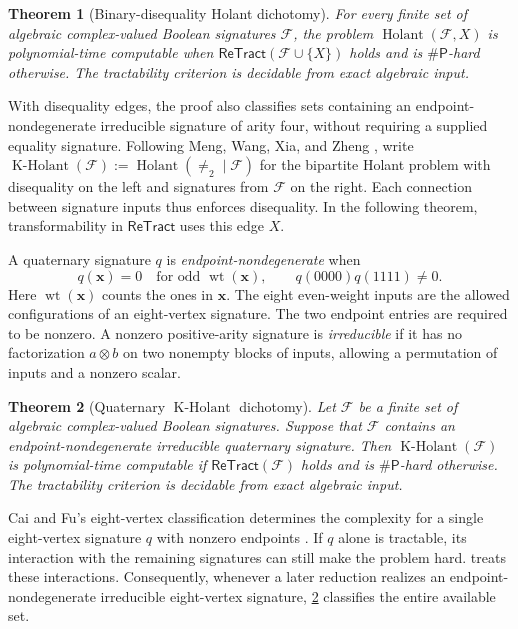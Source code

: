 \documentclass[11pt,letterpaper,onecolumn]{article}
\theoremstyle{plain}
\newtheorem{theorem}{Theorem}[section]
\theoremstyle{definition}
\theoremstyle{remark}
\newcommand{\cF}{\mathcal F}
\newcommand{\Holant}{\operatorname{Holant}}
\newcommand{\KHolant}{\operatorname{K\text{-}Holant}}
\newcommand{\ReTract}{\mathsf{ReTract}}
\newcommand{\SharpP}{\#\mathsf P}
\newcommand{\wt}{\operatorname{wt}}
\newcommand{\Neq}{\neq}
\begin{document}
\begin{theorem}[Binary-disequality Holant dichotomy]
\label{thm:p1-deq2-dichotomy}
For every finite set of algebraic complex-valued Boolean signatures \(\cF\),
the problem \(\Holant(\cF,X)\) is polynomial-time computable when
\(\ReTract(\cF\cup\{X\})\) holds and is \(\SharpP\)-hard otherwise.
The tractability criterion is decidable from exact algebraic input.
\end{theorem}

With disequality edges, the proof also classifies sets containing an
endpoint-nondegenerate irreducible signature of arity four, without
requiring a supplied equality signature. Following Meng, Wang, Xia, and Zheng
\cite{MengWangXiaZheng2025}, write
\(\KHolant(\cF):=\Holant(\Neq_2\mid\cF)\) for the bipartite Holant
problem with disequality on the left and signatures from \(\cF\) on the
right. Each connection between signature inputs thus enforces disequality.
In the following theorem, transformability in \(\ReTract\) uses this edge \(X\).

A quaternary signature \(q\) is
\emph{endpoint-nondegenerate} when
\[
 q({\mathbf{x}})=0\quad\text{for odd }\wt({\mathbf{x}}),\qquad q(0000)q(1111)\ne0.
\]
Here \(\wt({\mathbf{x}})\) counts the ones in \({\mathbf{x}}\). The eight
even-weight inputs are the allowed configurations of an eight-vertex
signature. The two endpoint entries are required to be nonzero.
A nonzero positive-arity signature is \emph{irreducible} if it has no factorization
\(a\otimes b\) on two nonempty blocks of inputs, allowing a permutation of inputs and a nonzero scalar.

\begin{theorem}[Quaternary \(\KHolant\) dichotomy]
\label{thm:p1-quaternary-kholant-dichotomy}
Let \(\cF\) be a finite set of algebraic complex-valued Boolean signatures.
Suppose that \(\cF\) contains an endpoint-nondegenerate irreducible
quaternary signature.  Then \(\KHolant(\cF)\) is polynomial-time computable
if \(\ReTract(\cF)\) holds and is \(\SharpP\)-hard otherwise.  The
tractability criterion is decidable from exact algebraic input.
\end{theorem}

Cai and Fu's eight-vertex classification determines the complexity for
a single eight-vertex signature \(q\) with nonzero endpoints
\cite[arXiv version~2, Theorem~3.1]{CaiFu2023}. If \(q\) alone is tractable,
its interaction with the remaining signatures can still make the problem hard.
 treats these interactions. Consequently, whenever
a later reduction realizes an endpoint-nondegenerate irreducible eight-vertex
signature, \cref{thm:p1-quaternary-kholant-dichotomy} classifies the entire available set.
\end{document}
